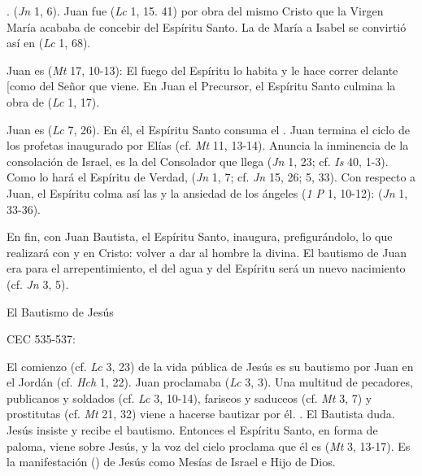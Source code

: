 	 . (\emph{Jn} 1, 6). Juan fue  (\emph{Lc} 1, 15. 41) por obra del mismo Cristo que la Virgen María acababa de concebir del Espíritu Santo. La  de María a Isabel se convirtió así en  (\emph{Lc} 1, 68).
	
	 Juan es  (\emph{Mt} 17, 10-13): El fuego del Espíritu lo habita y le hace correr delante {[}como \textquote{precursor}{]} del Señor que viene. En Juan el Precursor, el Espíritu Santo culmina la obra de  (\emph{Lc} 1, 17).
	
	 Juan es  (\emph{Lc} 7, 26). En él, el Espíritu Santo consuma el . Juan termina el ciclo de los profetas inaugurado por Elías (cf. \emph{Mt} 11, 13-14). Anuncia la inminencia de la consolación de Israel, es la  del Consolador que llega (\emph{Jn} 1, 23; cf. \emph{Is} 40, 1-3). Como lo hará el Espíritu de Verdad,  (\emph{Jn} 1, 7; cf. \emph{Jn} 15, 26; 5, 33). Con respecto a Juan, el Espíritu colma así las  y la ansiedad de los ángeles (\emph{1 P} 1, 10-12):  (\emph{Jn} 1, 33-36).
	
	 En fin, con Juan Bautista, el Espíritu Santo, inaugura, prefigurándolo, lo que realizará con y en Cristo: volver a dar al hombre la  divina. El bautismo de Juan era para el arrepentimiento, el del agua y del Espíritu será un nuevo nacimiento (cf. \emph{Jn} 3, 5).
	
	El Bautismo de Jesús
	
	CEC 535-537:
	
	 El comienzo (cf. \emph{Lc} 3, 23) de la vida pública de Jesús es su bautismo por Juan en el Jordán (cf. \emph{Hch} 1, 22). Juan proclamaba  (\emph{Lc} 3, 3). Una multitud de pecadores, publicanos y soldados (cf. \emph{Lc} 3, 10-14), fariseos y saduceos (cf. \emph{Mt} 3, 7) y prostitutas (cf. \emph{Mt} 21, 32) viene a hacerse bautizar por él. . El Bautista duda. Jesús insiste y recibe el bautismo. Entonces el Espíritu Santo, en forma de paloma, viene sobre Jesús, y la voz del cielo proclama que él es  (\emph{Mt} 3, 13-17). Es la manifestación () de Jesús como Mesías de Israel e Hijo de Dios.
	
